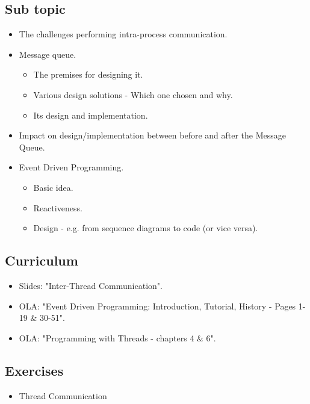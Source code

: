 \subsection{Sub topic}

\begin{itemize}
	\item The challenges performing intra-process communication.
	\item Message queue.
	\begin{itemize}
		\item The premises for designing it.
		\item Various design solutions - Which one chosen and why.
		\item Its design and implementation.
	\end{itemize}	
	\item Impact on design/implementation between before and after the Message Queue.
	\item Event Driven Programming.
	\begin{itemize}
		\item Basic idea.
		\item Reactiveness.
		\item Design - e.g. from sequence diagrams to code (or vice versa).
	\end{itemize}
\end{itemize}

\subsection{Curriculum}

\begin{itemize}
	\item Slides: "Inter-Thread Communication".
	\item OLA: "Event Driven Programming: Introduction, Tutorial, History - Pages 1-19 \& 30-51".
	\item OLA: "Programming with Threads - chapters 4 \& 6".
\end{itemize}

\subsection{Exercises}

\begin{itemize}
	\item Thread Communication
\end{itemize}